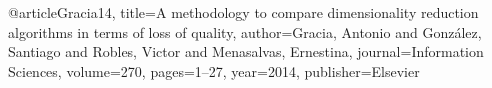 
@article{Gracia14,
	title={A methodology to compare dimensionality reduction algorithms in terms of loss of quality},
	author={Gracia, Antonio and Gonz{\'a}lez, Santiago and Robles, Victor and Menasalvas, Ernestina},
	journal={Information Sciences},
	volume={270},
	pages={1--27},
	year={2014},
	publisher={Elsevier}
}